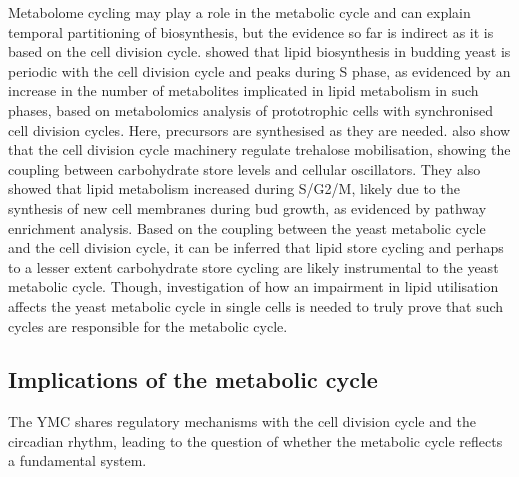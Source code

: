
Metabolome cycling may play a role in the metabolic cycle and can explain temporal partitioning of biosynthesis, but the evidence so far is indirect as it is based on the cell division cycle.
\textcite{campbellBuildingBlocksAre2020} showed that lipid biosynthesis in budding yeast is periodic with the cell division cycle and peaks during S phase, as evidenced by an increase in the number of metabolites implicated in lipid metabolism in such phases, based on metabolomics analysis of prototrophic cells with synchronised cell division cycles.
Here, precursors are synthesised as they are needed.
\textcite{ewaldYeastCyclinDependentKinase2016} also show that the cell division cycle machinery regulate trehalose mobilisation, showing the coupling between carbohydrate store levels and cellular oscillators.
They also showed that lipid metabolism increased during S/G2/M, likely due to the synthesis of new cell membranes during bud growth, as evidenced by pathway enrichment analysis.
Based on the coupling between the yeast metabolic cycle and the cell division cycle, it can be inferred that lipid store cycling and perhaps to a lesser extent carbohydrate store cycling are likely instrumental to the yeast metabolic cycle.
Though, investigation of how an impairment in lipid utilisation affects the yeast metabolic cycle in single cells is needed to truly prove that such cycles are responsible for the metabolic cycle.


\subsection{Implications of the metabolic cycle}
\label{subsec:intro-ymc-implications}


The YMC shares regulatory mechanisms with the cell division cycle and the circadian rhythm,
leading to the question of whether the metabolic cycle reflects a fundamental system.


